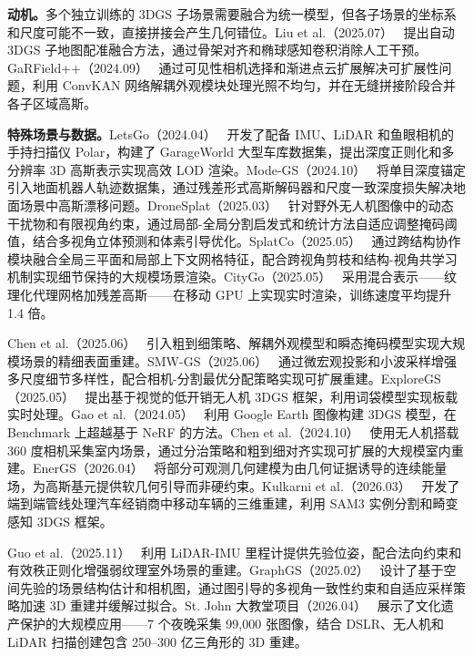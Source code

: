 \textbf{动机。}多个独立训练的 3DGS 子场景需要融合为统一模型，但各子场景的坐标系和尺度可能不一致，直接拼接会产生几何错位。Liu et al.（2025.07）~\cite{2507_20480} 提出自动 3DGS 子地图配准融合方法，通过骨架对齐和椭球感知卷积消除人工干预。GaRField++（2024.09）~\cite{2409_12774} 通过可见性相机选择和渐进点云扩展解决可扩展性问题，利用 ConvKAN 网络解耦外观模块处理光照不均匀，并在无缝拼接阶段合并各子区域高斯。

\textbf{特殊场景与数据。}LetsGo（2024.04）~\cite{2404_09748} 开发了配备 IMU、LiDAR 和鱼眼相机的手持扫描仪 Polar，构建了 GarageWorld 大型车库数据集，提出深度正则化和多分辨率 3D 高斯表示实现高效 LOD 渲染。Mode-GS（2024.10）~\cite{2410_04646} 将单目深度锚定引入地面机器人轨迹数据集，通过残差形式高斯解码器和尺度一致深度损失解决地面场景中高斯漂移问题。DroneSplat（2025.03）~\cite{2503_16964} 针对野外无人机图像中的动态干扰物和有限视角约束，通过局部-全局分割启发式和统计方法自适应调整掩码阈值，结合多视角立体预测和体素引导优化。SplatCo（2025.05）~\cite{2505_17951} 通过跨结构协作模块融合全局三平面和局部上下文网格特征，配合跨视角剪枝和结构-视角共学习机制实现细节保持的大规模场景渲染。CityGo（2025.05）~\cite{2505_21041} 采用混合表示——纹理化代理网格加残差高斯——在移动 GPU 上实现实时渲染，训练速度平均提升 1.4 倍。

Chen et al.（2025.06）~\cite{2506_17636} 引入粗到细策略、解耦外观模型和瞬态掩码模型实现大规模场景的精细表面重建。SMW-GS（2025.06）~\cite{2506_13516} 通过微宏观投影和小波采样增强多尺度细节多样性，配合相机-分割最优分配策略实现可扩展重建。ExploreGS（2025.05）~\cite{2505_10578} 提出基于视觉的低开销无人机 3DGS 框架，利用词袋模型实现板载实时处理。Gao et al.（2024.05）~\cite{2405_11021} 利用 Google Earth 图像构建 3DGS 模型，在 Benchmark 上超越基于 NeRF 的方法。Chen et al.（2024.10）~\cite{2410_11285} 使用无人机搭载 360 度相机采集室内场景，通过分治策略和粗到细对齐实现可扩展的大规模室内重建。EnerGS（2026.04）~\cite{2604_26238} 将部分可观测几何建模为由几何证据诱导的连续能量场，为高斯基元提供软几何引导而非硬约束。Kulkarni et al.（2026.03）~\cite{2603_26638} 开发了端到端管线处理汽车经销商中移动车辆的三维重建，利用 SAM3 实例分割和畸变感知 3DGS 框架。

Guo et al.（2025.11）~\cite{2511_06765} 利用 LiDAR-IMU 里程计提供先验位姿，配合法向约束和有效秩正则化增强弱纹理室外场景的重建。GraphGS（2025.02）~\cite{2502_17377} 设计了基于空间先验的场景结构估计和相机图，通过图引导的多视角一致性约束和自适应采样策略加速 3D 重建并缓解过拟合。St. John 大教堂项目（2026.04）~\cite{2604_24316} 展示了文化遗产保护的大规模应用——7 个夜晚采集 99,000 张图像，结合 DSLR、无人机和 LiDAR 扫描创建包含 250--300 亿三角形的 3D 重建。

